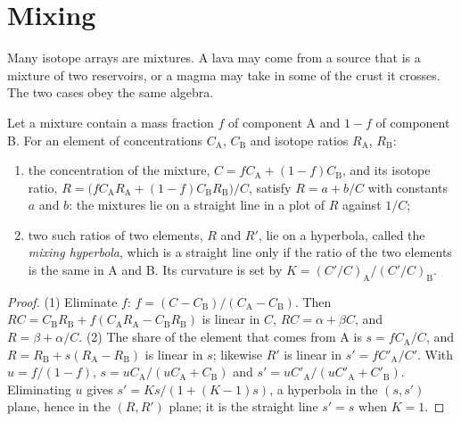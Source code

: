 \section{Mixing}

Many isotope arrays are mixtures. A lava may come from a source that is a
mixture of two reservoirs, or a magma may take in some of the crust it crosses.
The two cases obey the same algebra.

\begin{proposition}\label{prop:b2:isotope-geochemistry:mixing}
Let a mixture contain a mass fraction $f$ of component A and $1-f$ of component
B. For an element of concentrations $C_{\mathrm A}$, $C_{\mathrm B}$ and isotope
ratios $R_{\mathrm A}$, $R_{\mathrm B}$:
\begin{enumerate}
\item the concentration of the mixture, $C = fC_{\mathrm A} + (1-f)C_{\mathrm B}$, and
its isotope ratio,
$R = \bigl(fC_{\mathrm A}R_{\mathrm A} + (1-f)C_{\mathrm B}R_{\mathrm B}\bigr)/C$, satisfy
$R = a + b/C$ with constants $a$ and $b$: the mixtures lie on a straight line in
a plot of $R$ against $1/C$;
\item two such ratios of two elements, $R$ and $R'$, lie on a hyperbola, called
the \emph{mixing hyperbola}, which is a straight line only
if the ratio of the two elements is the same in A and B. Its curvature is set by
$K = (C'/C)_{\mathrm A}/(C'/C)_{\mathrm B}$.
\end{enumerate}
\end{proposition}

\begin{proof}
(1) Eliminate $f$: $f = (C - C_{\mathrm B})/(C_{\mathrm A} - C_{\mathrm B})$. Then
$RC = C_{\mathrm B}R_{\mathrm B} + f(C_{\mathrm A}R_{\mathrm A} - C_{\mathrm B}R_{\mathrm
B})$ is linear in $C$, $RC = \alpha + \beta C$, and $R = \beta + \alpha/C$.
(2) The share of the element that comes from A is $s = fC_{\mathrm A}/C$, and $R =
R_{\mathrm B} + s(R_{\mathrm A} - R_{\mathrm B})$ is linear in $s$; likewise $R'$ is
linear in $s' = fC'_{\mathrm A}/C'$. With $u = f/(1-f)$, $s = u C_{\mathrm
A}/(uC_{\mathrm A} + C_{\mathrm B})$ and $s' = uC'_{\mathrm A}/(uC'_{\mathrm A} +
C'_{\mathrm B})$. Eliminating $u$ gives $s' = Ks/(1 + (K-1)s)$, a hyperbola in the
$(s, s')$ plane, hence in the $(R, R')$ plane; it is the straight line $s' = s$
when $K = 1$.
\end{proof}

